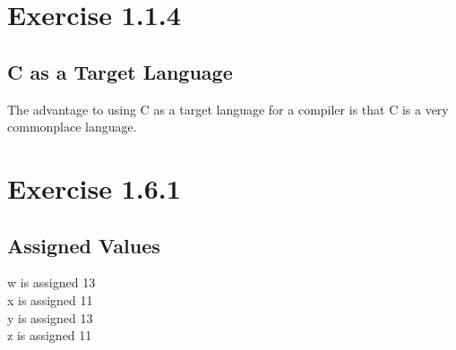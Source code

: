 \documentclass[letterpaper, 10pt,DIV=13]{scrartcl}
\numberwithin{equation}{section} %
\numberwithin{figure}{section} %
\numberwithin{table}{section} %
\begin{document}


\section{Exercise 1.1.4}

\subsection{C as a Target Language}
The advantage to using C as a target language for a compiler is that C is a very commonplace language.



\section{Exercise 1.6.1}

\subsection{Assigned Values}
w is assigned 13\\
x is assigned 11\\
y is assigned 13\\
z is assigned 11


\pagebreak
\end{document}
